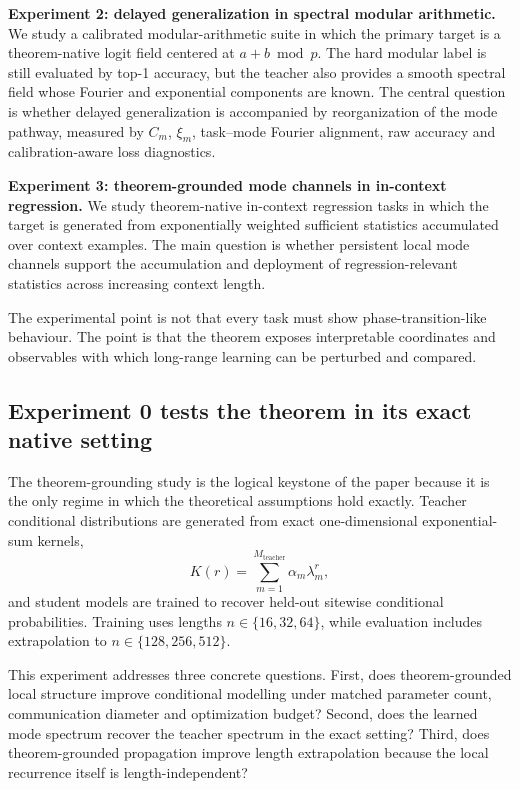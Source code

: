 \documentclass[11pt]{article}
\theoremstyle{definition}
\begin{document}
\textbf{Experiment 2: delayed generalization in spectral modular arithmetic.} We study a calibrated modular-arithmetic suite in which the primary target is a theorem-native logit field centered at \(a+b \bmod p\). The hard modular label is still evaluated by top-1 accuracy, but the teacher also provides a smooth spectral field whose Fourier and exponential components are known. The central question is whether delayed generalization is accompanied by reorganization of the mode pathway, measured by \(C_m\), \(\xi_m\), task--mode Fourier alignment, raw accuracy and calibration-aware loss diagnostics.

\textbf{Experiment 3: theorem-grounded mode channels in in-context regression.} We study theorem-native in-context regression tasks in which the target is generated from exponentially weighted sufficient statistics accumulated over context examples. The main question is whether persistent local mode channels support the accumulation and deployment of regression-relevant statistics across increasing context length.

The experimental point is not that every task must show phase-transition-like behaviour. The point is that the theorem exposes interpretable coordinates and observables with which long-range learning can be perturbed and compared.

\subsection*{Experiment 0 tests the theorem in its exact native setting}

The theorem-grounding study is the logical keystone of the paper because it is the only regime in which the theoretical assumptions hold exactly. Teacher conditional distributions are generated from exact one-dimensional exponential-sum kernels,
\begin{equation}
K(r)=\sum_{m=1}^{M_{\mathrm{teacher}}}\alpha_m\lambda_m^r,
\label{eq:teacher-kernel}
\end{equation}
and student models are trained to recover held-out sitewise conditional probabilities. Training uses lengths \(n\in\{16,32,64\}\), while evaluation includes extrapolation to \(n\in\{128,256,512\}\).

This experiment addresses three concrete questions. First, does theorem-grounded local structure improve conditional modelling under matched parameter count, communication diameter and optimization budget? Second, does the learned mode spectrum recover the teacher spectrum in the exact setting? Third, does theorem-grounded propagation improve length extrapolation because the local recurrence itself is length-independent?
\end{document}
